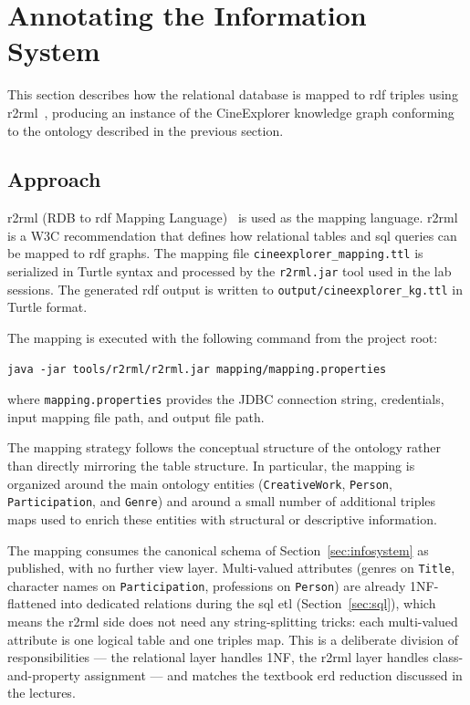 \section{Annotating the Information System}
\label{sec:mapping}

This section describes how the relational database is mapped to \ac{rdf} triples using \ac{r2rml}~\cite{r2rml}, producing an instance of the CineExplorer knowledge graph conforming to the ontology described in the previous section.

\subsection{Approach}

\ac{r2rml} (RDB to \ac{rdf} Mapping Language)~\cite{r2rml} is used as the mapping language. \ac{r2rml} is a W3C recommendation that defines how relational tables and \ac{sql} queries can be mapped to \ac{rdf} graphs. The mapping file \texttt{cineexplorer\_mapping.ttl} is serialized in Turtle syntax and processed by the \texttt{r2rml.jar} tool used in the lab sessions. The generated \ac{rdf} output is written to \texttt{output/cineexplorer\_kg.ttl} in Turtle format.

The mapping is executed with the following command from the project root:

\begin{verbatim}
java -jar tools/r2rml/r2rml.jar mapping/mapping.properties
\end{verbatim}

where \texttt{mapping.properties} provides the JDBC connection string, credentials, input mapping file path, and output file path.

The mapping strategy follows the conceptual structure of the ontology rather than directly mirroring the table structure. In particular, the mapping is organized around the main ontology entities (\texttt{CreativeWork}, \texttt{Person}, \texttt{Participation}, and \texttt{Genre}) and around a small number of additional triples maps used to enrich these entities with structural or descriptive information.

The mapping consumes the canonical schema of Section~\ref{sec:infosystem} as published, with no further view layer. Multi-valued attributes (genres on \texttt{Title}, character names on \texttt{Participation}, professions on \texttt{Person}) are already 1NF-flattened into dedicated relations during the \ac{sql} \ac{etl} (Section~\ref{sec:sql}), which means the \ac{r2rml} side does not need any string-splitting tricks: each multi-valued attribute is one logical table and one triples map. This is a deliberate division of responsibilities --- the relational layer handles 1NF, the \ac{r2rml} layer handles class-and-property assignment --- and matches the textbook \ac{erd} reduction discussed in the lectures.

